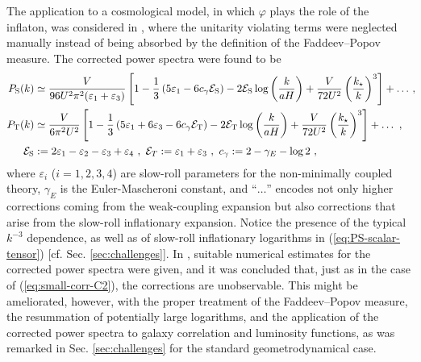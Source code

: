 \documentclass[12pt]{iopart}
\def\eq#1{\begin{equation}\begin{aligned}#1\end{aligned}\end{equation}}
\def\eref#1{(\ref{eq:#1})}
\begin{document}
The application to a cosmological model, in which $\varphi$ plays the role of the inflaton, was considered in \citet{Steinwachs:2019rsl,vanderWild:2019lah}, where the unitarity violating terms were neglected manually instead of being absorbed by the definition of the Faddeev--Popov measure. The corrected power spectra were found to be
\eq{\label{eq:PS-scalar-tensor}
P_{\mathrm{S}}(k)&\simeq \frac{V}{96 U^2 \pi^2(\varepsilon_{1}+\varepsilon_{3})}
\left[1 - \frac{1}{3}\left(5\varepsilon_{1}-6c_{\gamma}\mathcal{E}_{\mathrm{S}}\right)-2\mathcal{E}_{\mathrm{S}}\log\left(\frac{k}{aH}\right)+\frac{V}{ 72 U^2}\left(\frac{k_{\star}}{k }\right)^3\right]+\ldots \,,\!\!  \\
P_{\mathrm{T}}(k)&\simeq\frac{V}{6\pi^2 U^2}\left[1-\frac{1}{3}\left(5\varepsilon_1+6\varepsilon_3-6c_{\gamma}\mathcal{E}_{\mathrm{T}}\right)-2\mathcal{E}_{\mathrm{T}}\log\left(\frac{k}{aH}\right)+\frac{V}{72U^2}\left(\frac{k_{\star}}{k }\right)^3\right]+\ldots \ , \\
\mathcal{E}_{\rm S} &:= 2\varepsilon_1-\varepsilon_2-\varepsilon_3+\varepsilon_4 \ , \ \mathcal{E}_T := \varepsilon_1+\varepsilon_3 \ , \ c_{\gamma} := 2 -\gamma_E-\log 2 \ ,
}
where $\varepsilon_i$ ($i=1,2,3,4$) are slow-roll parameters for the non-minimally coupled theory, $\gamma_E$ is the Euler-Mascheroni constant, and ``$\ldots$'' encodes not only higher corrections coming from the weak-coupling expansion but also corrections that arise from the slow-roll inflationary expansion. Notice the presence of the typical $k^{-3}$ dependence, as well as of slow-roll inflationary logarithms in \eref{PS-scalar-tensor} [cf. Sec. \ref{sec:challenges}]. In \citet{Steinwachs:2019rsl,vanderWild:2019lah}, suitable numerical estimates for the corrected power spectra were given, and it was concluded that, just as in the case of \eref{small-corr-C2}, the corrections are unobservable. This might be ameliorated, however, with the proper treatment of the Faddeev--Popov measure, the resummation of potentially large logarithms, and the application of the corrected power spectra to galaxy correlation and luminosity functions, as was remarked in Sec. \ref{sec:challenges} for the standard geometrodynamical case.
\end{document}
